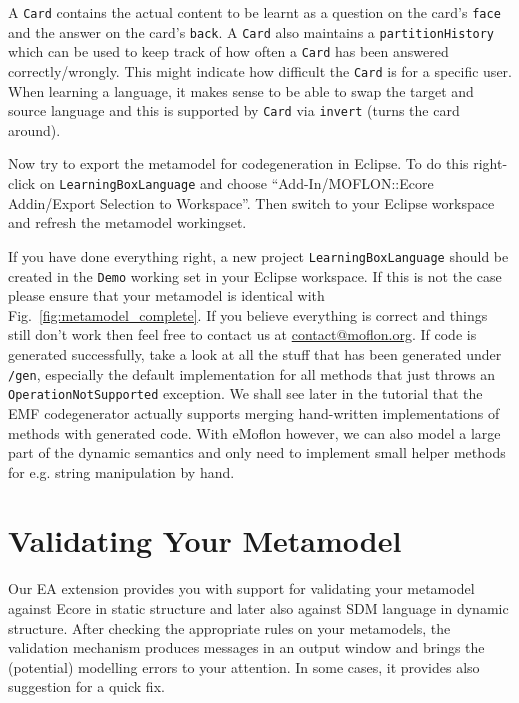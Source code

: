 \clearpage

A \texttt{Card} contains the actual content to be learnt as a question on the
card's \texttt{face} and the answer on the card's \texttt{back}. A \texttt{Card}
also maintains a \texttt{partition\-History} which can be used to keep track of
how often a \texttt{Card} has been answered correctly/wrongly.  This might
indicate how difficult the \texttt{Card} is for a specific user.
When learning a language, it makes sense to be able to swap the target and
source language and this is supported by \texttt{Card} via \texttt{invert}
(turns the card around).

Now try to export the metamodel for codegeneration in Eclipse.  To do this
right-click on \texttt{LearningBoxLanguage} and choose ``Add-In/MOFLON::Ecore
Addin/Export Selection to Workspace''.  Then switch to your Eclipse work\-space
and refresh the metamodel workingset.

If you have done everything right, a new project \texttt{LearningBoxLanguage}
should be created in the \texttt{Demo} working set in your Eclipse workspace.
If this is not the case please ensure that your metamodel is identical with
Fig.~\ref{fig:metamodel_complete}.  If you believe everything is correct and
things still don't work then feel free to contact us at
\href{mailto:contact@moflon.org}{contact@moflon.org}.  If code is generated
successfully, take a look at all the stuff that has been generated under
\texttt{/gen}, especially the default  implementation for all methods that just
throws an  \texttt{OperationNotSupported} exception.  We shall see later in the
tutorial  that the EMF codegenerator actually supports merging hand-written
implementations of methods with generated code.  With eMoflon however, we can
also model a large part of the dynamic semantics and only need to implement
small helper methods for e.g. string manipulation by hand.

\section{Validating Your Metamodel}
\label{sect:instance}

Our EA extension provides you with support for validating
your metamodel against Ecore in static structure and later also against SDM
language in dynamic structure. After checking the appropriate rules on your
metamodels, the validation mechanism produces messages in an output window and
brings the (potential) modelling errors to your attention. In some cases, it
provides also suggestion for a quick fix.

